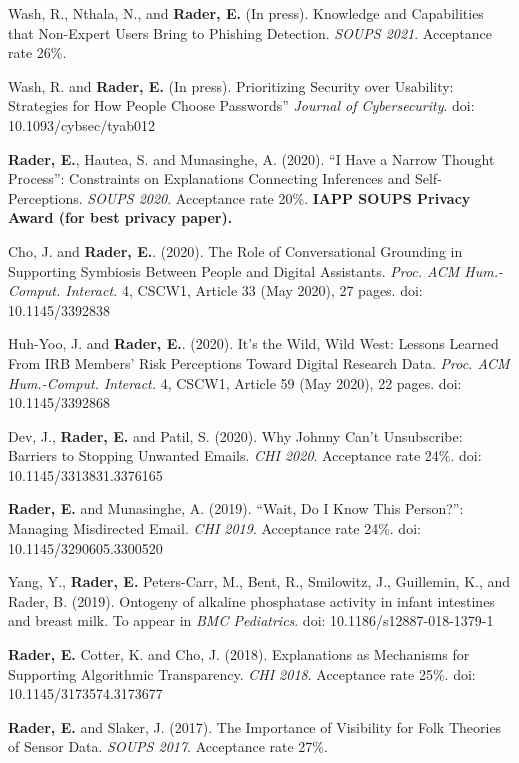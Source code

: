 \documentclass[9pt]{extarticle}
\begin{document}
Wash, R., Nthala, N., and \textbf{Rader, E.} (In press). Knowledge and Capabilities that Non-Expert Users Bring to Phishing Detection. \emph{SOUPS 2021}. Acceptance rate 26\%. 

Wash, R. and \textbf{Rader, E.} (In press). Prioritizing Security over Usability: Strategies for How People Choose Passwords” \emph{Journal of Cybersecurity}. doi: 10.1093/cybsec/tyab012

\textbf{Rader, E.}, Hautea, S. and Munasinghe, A. (2020). ``I Have a Narrow Thought Process'': Constraints on Explanations Connecting Inferences and Self-Perceptions. \emph{SOUPS 2020}. Acceptance rate 20\%. \textbf{IAPP SOUPS Privacy Award (for best privacy paper).}

Cho, J. and \textbf{Rader, E.}. (2020). The Role of Conversational Grounding in Supporting Symbiosis Between People and Digital Assistants. \emph{Proc. ACM Hum.-Comput. Interact.} 4, CSCW1, Article 33 (May 2020), 27 pages. doi: 10.1145/3392838

Huh-Yoo, J. and \textbf{Rader, E.}. (2020). It's the Wild, Wild West: Lessons Learned From IRB Members' Risk Perceptions Toward Digital Research Data. \emph{Proc. ACM Hum.-Comput. Interact.} 4, CSCW1, Article 59 (May 2020), 22 pages. doi: 10.1145/3392868

Dev, J., \textbf{Rader, E.} and Patil, S. (2020). Why Johnny Can't Unsubscribe: Barriers to Stopping Unwanted Emails. \emph{CHI 2020}. Acceptance rate 24\%. doi: 10.1145/3313831.3376165

\textbf{Rader, E.} and Munasinghe, A. (2019). ``Wait, Do I Know This Person?'': Managing Misdirected Email.  \emph{CHI 2019}. Acceptance rate 24\%. doi: 10.1145/3290605.3300520

Yang, Y., \textbf{Rader, E.} Peters-Carr, M., Bent, R., Smilowitz, J., Guillemin, K., and Rader, B. (2019). Ontogeny of alkaline phosphatase activity in infant intestines and breast milk. To appear in \emph{BMC Pediatrics}. doi: 10.1186/s12887-018-1379-1

\textbf{Rader, E.} Cotter, K. and Cho, J. (2018). Explanations as Mechanisms for Supporting Algorithmic Transparency.  \emph{CHI 2018}. Acceptance rate 25\%. doi: 10.1145/3173574.3173677

\textbf{Rader, E.} and Slaker, J. (2017). The Importance of Visibility for Folk Theories of Sensor Data. \emph{SOUPS 2017}. Acceptance rate 27\%. 
\end{document}
